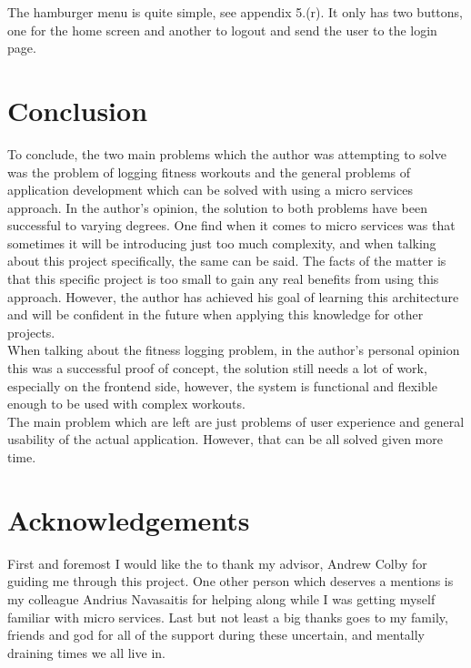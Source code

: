 \documentclass{article}
\newcommand{\vspaceconst}{-2ex}
\begin{document}
\begin{multicols}{2}
The hamburger menu is quite simple, see appendix 5.(r). It only has two buttons, one for the home screen and another to logout and send the user to the login page.\\


\section{Conclusion}
\vspace{\vspaceconst}

To conclude, the two main problems which the author was attempting to solve was the problem of logging fitness workouts and the general problems of application development which can be solved with using a micro services approach. In the author's opinion, the solution to both problems have been successful to varying degrees. One find when it comes to micro services was that sometimes it will be introducing just too much complexity, and when talking about this project specifically, the same can be said. The facts of the matter is that this specific project is too small to gain any real benefits from using this approach. However, the author has achieved his goal of learning this architecture and will be confident in the future when applying this knowledge for other projects.\\
When talking about the fitness logging problem, in the author's personal opinion this was a successful proof of concept, the solution still needs a lot of work, especially on the frontend side, however, the system is functional and flexible enough to be used with complex workouts.\\
The main problem which are left are just problems of user experience and general usability of the actual application. However, that can be all solved given more time.\\

\section*{Acknowledgements}
\vspace{\vspaceconst}
First and foremost I would like the to thank my advisor, Andrew Colby for guiding me through this project. One other person which deserves a mentions is my colleague Andrius Navasaitis for helping along while I was getting myself familiar with micro services. Last but not least a big thanks goes to my family, friends and god for all of the support during these uncertain, and mentally draining times we all live in.\\


\end{multicols}
\end{document}
